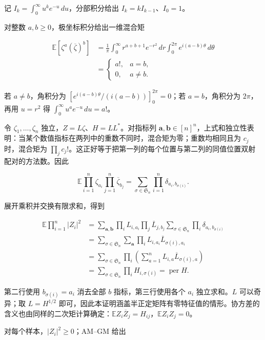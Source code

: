 \documentclass[11pt,a4paper]{article}
\begin{document}
记 \(I_k=\int_0^\infty u^ke^{-u}\,du\)，分部积分给出 \(I_k=kI_{k-1}\)、\(I_0=1\)。

对整数 \(a,b\ge0\)，极坐标积分给出一维混合矩

\[\begin{aligned}
\mathbb E[\zeta^a(\overline\zeta)^b]
&=\frac1\pi\int_0^\infty r^{a+b+1}e^{-r^2}\,dr
\int_0^{2\pi}e^{i(a-b)\theta}\,d\theta\\
&=\begin{cases}a!,&a=b,\\0,&a\ne b.\end{cases}
\end{aligned}\]

若 \(a\ne b\)，角积分为 \([e^{i(a-b)\theta}/(i(a-b))]_0^{2\pi}=0\)；若 \(a=b\)，角积分为 \(2\pi\)，再用 \(u=r^2\) 得 \(\int_0^\infty u^ae^{-u}\,du=a!\)。

令 \(\zeta_1,\ldots,\zeta_n\) 独立，\(Z=L\zeta\)、\(H=LL^*\)。对指标列 \(\boldsymbol a,\boldsymbol b\in[n]^n\)，上式和独立性表明：当某个数值指标在两列中的重数不同时，混合矩为零；重数均相同且为 \(c_j\) 时，混合矩为 \(\prod_jc_j!\)。这正好等于把第一列的每个位置与第二列的同值位置双射配对的方法数。因此

\[\mathbb E\prod_{i=1}^n\zeta_{a_i}\prod_{j=1}^n\overline\zeta_{b_j}
=\sum_{\sigma\in \mathfrak S_n}\prod_{i=1}^n\delta_{a_i,b_{\sigma(i)}}.\]

展开乘积并交换有限求和，得到

\[\begin{aligned}
\mathbb E\prod_{i=1}^n|Z_i|^2
&=\sum_{\boldsymbol a,\boldsymbol b}
\prod_iL_{i,a_i}\prod_j\overline L_{j,b_j}
\sum_{\sigma\in \mathfrak S_n}\prod_i\delta_{a_i,b_{\sigma(i)}}\\
&=\sum_{\sigma\in \mathfrak S_n}\sum_{\boldsymbol a}
\prod_i L_{i,a_i}\overline L_{\sigma(i),a_i}\\
&=\sum_{\sigma\in \mathfrak S_n}\prod_i
\left(\sum_{a=1}^nL_{i,a}\overline L_{\sigma(i),a}\right)\\
&=\sum_{\sigma\in \mathfrak S_n}\prod_iH_{i,\sigma(i)}
=\operatorname{per}H.
\end{aligned}\]

第二行使用 \(b_{\sigma(i)}=a_i\) 消去全部 \(b\) 指标，第三行使用各个 \(a_i\) 独立求和。\(L\) 可以奇异；取 \(L=H^{1/2}\) 即可，因此本证明涵盖半正定矩阵有零特征值的情形。协方差的含义也由同样的二次矩计算确定：\(\mathbb EZ_i\overline Z_j=H_{ij}\)，\(\mathbb EZ_iZ_j=0\)。

对每个样本，\(|Z_i|^2\ge0\)；AM--GM 给出
\end{document}

